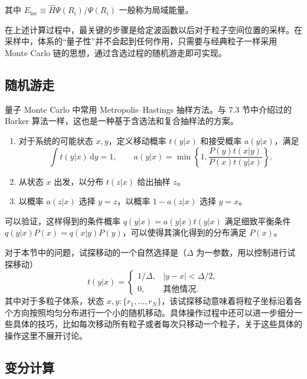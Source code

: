其中 $E_{\mathrm{loc}}\equiv \hat H\Psi(R_i)/\Psi(R_i)$ 一般称为局域能量。

在上述计算过程中，最关键的步骤是给定波函数以后对于粒子空间位置的采样。在采样中，体系的“量子性”并不会起到任何作用，只需要与经典粒子一样采用 Monte Carlo 链的思想，通过含选过程的随机游走即可实现。

\subsection{随机游走}

量子 Monte Carlo 中常用 Metropolis--Hastings 抽样方法。与 7.3 节中介绍过的 Barker 算法一样，这也是一种基于含选法和复合抽样法的方案。

\begin{algorithmBox}
\begin{enumerate}[label=\arabic*.,leftmargin=2em]
\item 对于系统的可能状态 $x,y$，定义移动概率 $t(y|x)$ 和接受概率 $a(y|x)$，满足
\[
\int t(y|x)\,\mathrm dy=1,\qquad a(y|x)=\min\left\{1,\frac{P(y)t(x|y)}{P(x)t(y|x)}\right\}.
\]
\item 从状态 $x$ 出发，以分布 $t(z|x)$ 给出抽样 $z$。
\item 以概率 $a(z|x)$ 选择 $y=z$，以概率 $1-a(z|x)$ 选择 $y=x$。
\end{enumerate}
\end{algorithmBox}

可以验证，这样得到的条件概率 $q(y|x)=a(y|x)t(y|x)$ 满足细致平衡条件 $q(y|x)P(x)=q(x|y)P(y)$，可以使得其演化得到的分布满足 $P(x)$。

对于本节中的问题，试探移动的一个自然选择是（$\Delta$ 为一参数，用以控制进行试探移动）
\begin{equation}
t(y|x)=
\begin{cases}
1/\Delta,&|y-x|<\Delta/2,\\
0,&\text{其他情况}.
\end{cases}
\tag{7.6.4}
\end{equation}
其中对于多粒子体系，状态 $x,y:\{r_1,\ldots,r_N\}$，该试探移动意味着将粒子坐标沿着各个方向按照均匀分布进行一个小的随机移动。具体操作过程中还可以进一步细分一些具体的技巧，比如每次移动所有粒子或者每次只移动一个粒子，关于这些具体的操作这里不展开讨论。

\subsection{变分计算}

